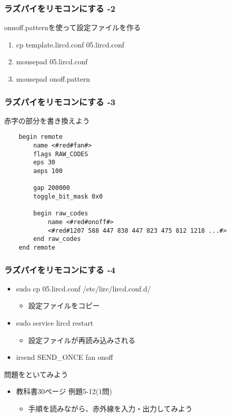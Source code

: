 \begin{frame}
    \frametitle{ラズパイをリモコンにする -2} 
    onnoff.patternを使って設定ファイルを作る
    \begin{enumerate}
        \item cp template.lircd.conf 05.lircd.conf
        \item mousepad 05.lircd.conf
        \item mousepad onoff.pattern
    \end{enumerate}
\end{frame}

\begin{frame}[fragile]
    \frametitle{ラズパイをリモコンにする -3}
    赤字の部分を書き換えよう
    \begin{lstlisting}
    begin remote
        name <#red#fan#>
        flags RAW_CODES
        eps 30
        aeps 100

        gap 200000
        toggle_bit_mask 0x0
    
        begin raw_codes
            name <#red#onoff#>
            <#red#1207 588 447 838 447 823 475 812 1218 ...#>
        end raw_codes
    end remote
    \end{lstlisting}
\end{frame}

\begin{frame}
    \frametitle{ラズパイをリモコンにする -4}
    \begin{itemize}
        \item sudo cp 05.lircd.conf /etc/lirc/lircd.conf.d/
        \begin{itemize}
            \item 設定ファイルをコピー
        \end{itemize}
        \item sudo service lircd restart
        \begin{itemize}
            \item 設定ファイルが再読み込みされる
        \end{itemize}
        \item irsend SEND\_ONCE \color{red}fan onoff\color{black}
    \end{itemize}
\end{frame}

\begin{frame}
    \begin{exampleblock}{問題をといてみよう}
    \begin{itemize}
        \item 教科書30ページ 例題5-12(1問)
        \begin{itemize}
            \item 手順を読みながら、赤外線を入力・出力してみよう
        \end{itemize}
    \end{itemize}
    \end{exampleblock}
\end{frame}

